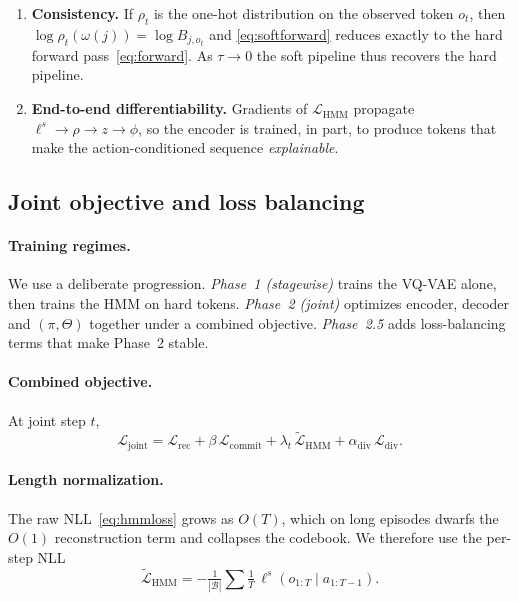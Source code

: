 \documentclass[twocolumn,10pt]{article}
\newcommand{\Lcal}{\mathcal{L}}
\begin{document}
\begin{enumerate}
\item \textbf{Consistency.} If $\rho_t$ is the one-hot distribution on the
      observed token $o_t$, then $\log\rho_t(\omega(j))=\log B_{j,o_t}$ and
      \eqref{eq:softforward} reduces exactly to the hard
      forward pass~\eqref{eq:forward}. As $\tau\to0$ the soft pipeline thus
      recovers the hard pipeline.
\item \textbf{End-to-end differentiability.} Gradients of $\Lcal_{\mathrm{HMM}}$
      propagate $\ell^{s}\!\to\!\rho\!\to\!z\!\to\!\phi$, so the encoder is
      trained, in part, to produce tokens that make the action-conditioned
      sequence \emph{explainable}.
\end{enumerate}

\subsection{Joint objective and loss balancing}
\label{sec:joint}

\paragraph{Training regimes.}
We use a deliberate progression. \emph{Phase~1 (stagewise)} trains the VQ-VAE
alone, then trains the HMM on hard tokens. \emph{Phase~2 (joint)} optimizes
encoder, decoder and $(\pi,\Theta)$ together under a combined objective.
\emph{Phase~2.5} adds loss-balancing terms that make Phase~2 stable.

\paragraph{Combined objective.}
At joint step $t$,
\begin{equation}
\Lcal_{\mathrm{joint}} = \Lcal_{\mathrm{rec}}
  + \beta\,\Lcal_{\mathrm{commit}}
  + \lambda_t\,\widetilde{\Lcal}_{\mathrm{HMM}}
  + \alpha_{\mathrm{div}}\,\Lcal_{\mathrm{div}}.
\label{eq:joint}
\end{equation}

\paragraph{Length normalization.}
The raw NLL~\eqref{eq:hmmloss} grows as $O(T)$, which on long episodes dwarfs
the $O(1)$ reconstruction term and collapses the codebook. We therefore use
the per-step NLL
\begin{equation}
\widetilde{\Lcal}_{\mathrm{HMM}}=-\tfrac{1}{|\mathcal{B}|}
   \textstyle\sum \tfrac{1}{T}\,\ell^{s}(o_{1:T}\mid a_{1:T-1}).
\end{equation}
\end{document}

